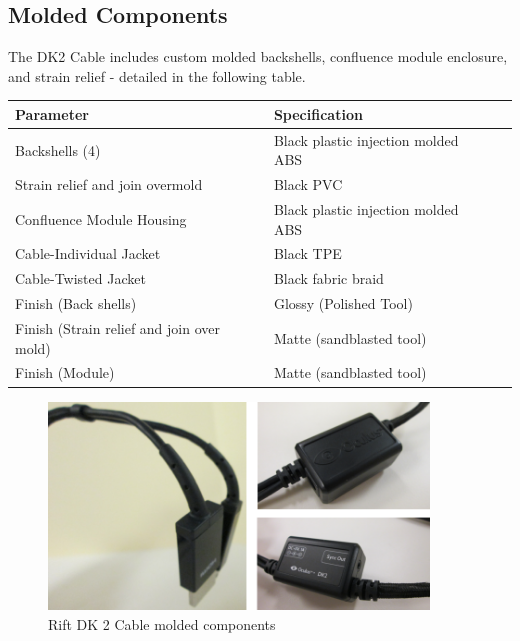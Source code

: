 \documentclass[letterpaper]{article}
\begin{document}
\newpage

\subsection{Molded Components}
The DK2 Cable includes custom molded backshells, confluence module enclosure, and strain relief - detailed in the following table.

\begin{center}
    \begin{tabular}{ | l | l | p{8cm} |}
    \hline
    \cellcolor{lightgray} Parameter & \cellcolor{lightgray} Specification \\ \hline
    Backshells (4) & Black plastic injection molded ABS \\ \hline
    Strain relief and join overmold & Black PVC \\ \hline
    Confluence Module Housing & Black plastic injection molded ABS \\ \hline
    Cable-Individual Jacket & Black TPE \\ \hline
    Cable-Twisted Jacket & Black fabric braid \\ \hline
    Finish (Back shells) & Glossy (Polished Tool) \\ \hline
    Finish (Strain relief and join over mold) & Matte (sandblasted tool) \\ \hline
    Finish (Module) & Matte (sandblasted tool) \\ \hline
    \end{tabular}
\end{center}

\begin{figure}[H]  
  \centering
    \includegraphics[width=0.9\textwidth]{Figures/DK2_Cable_Molded_Components.png}
  \caption{Rift DK 2 Cable molded components}
  \label{Cable_Molded_Components}
\end{figure}
\end{document}
